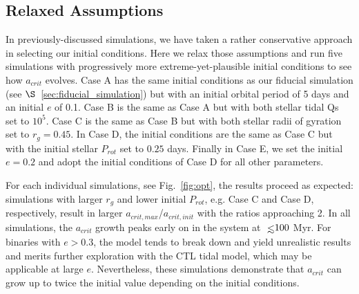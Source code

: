 \subsection{Relaxed Assumptions} \label{sec:optimistic}

In previously-discussed simulations, we have taken a rather conservative approach in selecting our initial conditions.  Here we relax those assumptions and run five simulations with progressively more extreme-yet-plausible initial conditions to see how $a_{crit}$ evolves. Case A has the same initial conditions as our fiducial simulation (see $\S$~\ref{sec:fiducial_simulation}) but with an initial orbital period of 5 days and an initial $e$ of 0.1.  Case B is the same as Case A but with both stellar tidal Qs set to $10^5$.  Case C is the same as Case B but with both stellar radii of gyration set to $r_g = 0.45$.  In Case D, the initial conditions are the same as Case C but with the initial stellar $P_{rot}$ set to $0.25$ days.  Finally in Case E, we set the initial $e=0.2$ and adopt the initial conditions of Case D for all other parameters.

For each individual simulations, see Fig.~\ref{fig:opt}, the results proceed as expected: simulations with larger $r_g$ and lower initial $P_{rot}$, e.g. Case C and Case D, respectively, result in larger $a_{crit,max}$/$a_{crit,init}$ with the ratios approaching 2.  In all simulations, the $a_{crit}$ growth peaks early on in the system at $\lsim 100$ Myr.  For binaries with $e > 0.3$, the model tends to break down and yield unrealistic results and merits further exploration with the CTL tidal model, which may be applicable at large $e$.  Nevertheless, these simulations demonstrate that $a_{crit}$ can grow up to twice the initial value depending on the initial conditions.

